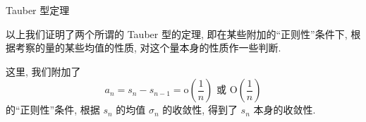 
\begin{frame}{Tauber 型定理}

以上我们证明了两个所谓的 Tauber 型的定理, 即在某些附加的``正则性''条件下, 根据考察的量的某些均值的性质, 对这个量本身的性质作一些判断.

\pause
\vspace{1em}

这里, 我们附加了
\[a_n = s_n - s_{n-1} = \mathrm{o}\left(\dfrac{1}{n}\right) \text{ 或 } \mathrm{O}\left(\dfrac{1}{n}\right)\]
的``正则性''条件, 根据 $s_n$ 的均值 $\sigma_n$ 的收敛性, 得到了 $s_n$ 本身的收敛性.

\end{frame}



















